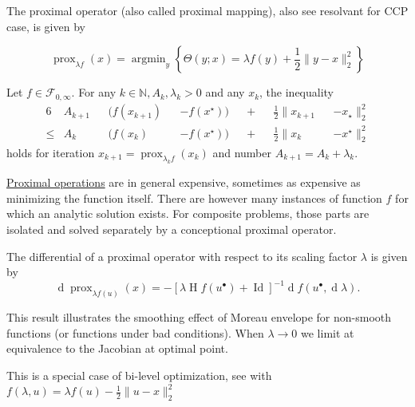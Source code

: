 \documentclass{article}
\DeclareMathOperator{\prox}{prox}
\DeclareMathOperator*{\argmin}{argmin}
\DeclareMathOperator{\id}{Id}
\DeclareMathOperator{\hessian}{H}
\DeclareMathOperator{\diff}{d}
\newcommand{\optimal}[1]{{#1^{\scriptscriptstyle\bullet}}}
\begin{document}
\begin{definition}[label=f6izn8iw, name=Proximal Operator]
	The proximal operator (also called proximal mapping), also see resolvant for CCP case, is given by 

	\[
		\prox_{\lambda f}(x) = \argmin_y \left\{ \Theta(y; x) = \lambda f(y) + \frac{1}{2}\lVert y - x\rVert_2^2\right\}
	\]

    \begin{theorem}[label=78req5r7, name=Convergence with Lyapunov Analysis]
        Let \( f\in\mathcal{F}_{0,\infty} \). For any \( k\in\mathbb{N}, A_k, \lambda_k > 0\) and any \( x_k \), the inequality
        \begin{alignat*}{6}
            &A_{k+1}&&(f(x_{k+1}) &&- f(x^\star)) &&+ &&\frac{1}{2}\lVert x_{k+1} &&- x_\star\rVert^2_2  \\
            \leq &A_k&&(f(x_k)   &&- f(x^\star)) &&+ &&\frac{1}{2}\lVert x_k   &&- x^\star\rVert_2^2
        \end{alignat*}
        holds for iteration \( x_{k+1} = \prox_{\lambda_kf}(x_k) \) and number \(A_{k+1}= A_k + \lambda_k\).
    \end{theorem}

    \begin{remark}[label=hnns6j86, name=Computation complexity]
	\hyperref[f6izn8iw]{Proximal operations} are in general expensive, sometimes as expensive as
        minimizing the function itself. There are however many instances of
        function \( f \) for which an analytic solution exists. For composite
        problems, those parts are isolated and solved separately by a
        conceptional proximal operator.
    \end{remark}

    \begin{remark}[label=sbkmp32j, name=Differentials of Proximals]
	The differential of a proximal operator with respect to its scaling
	factor \( \lambda \) is given by
	\[
		\diff{\prox_{\lambda f(u)}{(x)}} = -[\lambda \hessian f(\optimal{u}) +
		\id]^{-1}\diff{f(\optimal{u}, \diff\lambda)}.
	\]

	This result illustrates the smoothing effect of Moreau envelope for
	non-smooth functions (or functions under bad conditions). When
	\(\lambda \to 0\) we limit at equivalence to the Jacobian at optimal point.

	This is a special case of bi-level optimization, see \cite[Lemma
	3.2][lemma.3.2]{bilevel_diff} with \( f(\lambda, u) = \lambda f(u) - \frac{1}{2}\lVert u-x\rVert^2_2 \)
    \end{remark}
\end{definition}
\end{document}
